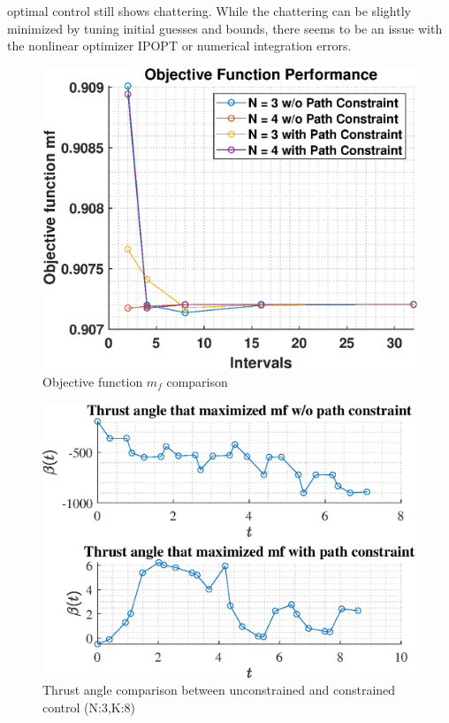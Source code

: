 \documentclass[]{article}
\begin{document}
optimal control still shows chattering. While the chattering can be slightly minimized by tuning initial guesses and bounds, there seems to be an issue with the nonlinear optimizer IPOPT or numerical integration errors.

	\begin{figure}
		\centering
		\includegraphics[scale=0.75]{maxMfComparison.eps}
		\caption{Objective function \(m_f\) comparison}
		\label{fig:maxMfComparison}
	\end{figure}
	\begin{figure}
		\centering
		\includegraphics[scale=0.75]{maxMfBetaCompare.eps}
		\caption{Thrust angle comparison between unconstrained and constrained control (N:3,K:8)}
		\label{fig:maxMfBetaCompare}
    \end{figure}
\end{document}
